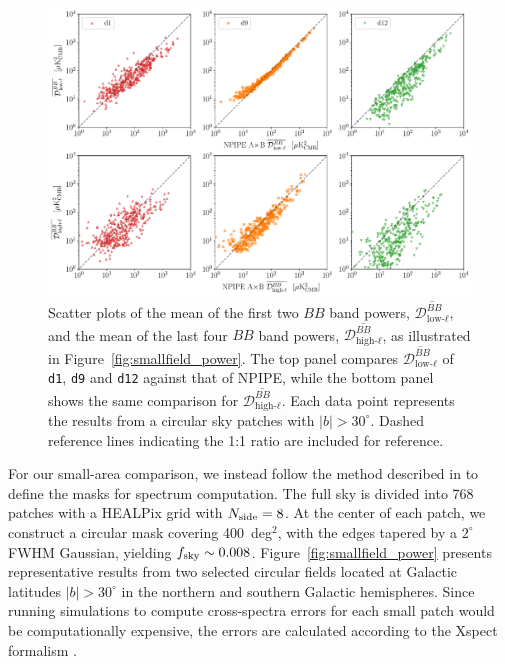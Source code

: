 \documentclass[twocolumn]{aastex631}
\begin{document}
\begin{figure}
    \centering
    \includegraphics[width=2.1\columnwidth]{figures/llmean_hlmean_comparison.pdf}
    \caption{Scatter plots of the mean of the first two $BB$ band powers, $\overline{\mathcal{D}_{\text{low-}\ell}^{BB}}$, and the mean of the last four $BB$ band powers, $\overline{\mathcal{D}_{\text{high-}\ell}^{BB}}$, as illustrated in Figure~\ref{fig:smallfield_power}. The top panel compares $\overline{\mathcal{D}_{\text{low-}\ell}^{BB}}$ of \texttt{d1}, \texttt{d9} and \texttt{d12} against that of NPIPE, while the bottom panel shows the same comparison for $\overline{\mathcal{D}_{\text{high-}\ell}^{BB}}$. Each data point represents the results from a circular sky patches with $|b| > 30^\circ$. Dashed reference lines indicating the 1:1 ratio are included for reference.}
    \label{fig:smallfield_power_all}
\end{figure}

For our small-area comparison, we instead follow the method described in \cite{planck2014-XXX} to define the masks for spectrum computation. The full sky is divided into 768 patches with a HEALPix grid with $N_{\rm side} = 8$. At the center of each patch, we construct a circular mask covering 400~deg$^2$, with the edges tapered by a $2^\circ$ FWHM Gaussian, yielding $f_{\rm sky} \sim 0.008$. Figure~\ref{fig:smallfield_power} presents representative results from two selected circular fields located at Galactic latitudes $|b| > 30^\circ$ in the northern and southern Galactic hemispheres. Since running simulations to compute cross-spectra errors for each small patch would be computationally expensive, the errors are calculated according to the Xspect formalism \citep{Tristram:2005}. 
\end{document}
